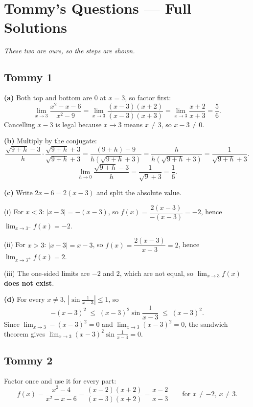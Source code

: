 \documentclass[11pt]{article}
\begin{document}
\section*{Tommy's Questions --- Full Solutions}
\noindent\textit{These two are ours, so the steps are shown.}
\medskip

\subsection*{Tommy 1}

\noindent\textbf{(a)} Both top and bottom are $0$ at $x=3$, so factor first:
\[
\lim_{x\to3}\frac{x^{2}-x-6}{x^{2}-9}
=\lim_{x\to3}\frac{(x-3)(x+2)}{(x-3)(x+3)}
=\lim_{x\to3}\frac{x+2}{x+3}
=\frac{5}{6}.
\]
Cancelling $x-3$ is legal because $x\to3$ means $x\neq3$, so $x-3\neq0$.

\medskip
\noindent\textbf{(b)} Multiply by the conjugate:
\[
\frac{\sqrt{9+h}-3}{h}\cdot\frac{\sqrt{9+h}+3}{\sqrt{9+h}+3}
=\frac{(9+h)-9}{h\left(\sqrt{9+h}+3\right)}
=\frac{h}{h\left(\sqrt{9+h}+3\right)}
=\frac{1}{\sqrt{9+h}+3}.
\]
\[
\lim_{h\to0}\frac{\sqrt{9+h}-3}{h}=\frac{1}{\sqrt{9}+3}=\frac{1}{6}.
\]

\medskip
\noindent\textbf{(c)} Write $2x-6=2(x-3)$ and split the absolute value.

\noindent (i) For $x<3$: $|x-3|=-(x-3)$, so
$f(x)=\dfrac{2(x-3)}{-(x-3)}=-2$, hence $\displaystyle\lim_{x\to3^{-}}f(x)=-2$.

\noindent (ii) For $x>3$: $|x-3|=x-3$, so
$f(x)=\dfrac{2(x-3)}{x-3}=2$, hence $\displaystyle\lim_{x\to3^{+}}f(x)=2$.

\noindent (iii) The one-sided limits are $-2$ and $2$, which are not equal, so
$\displaystyle\lim_{x\to3}f(x)$ \textbf{does not exist}.

\medskip
\noindent\textbf{(d)} For every $x\neq3$, $\left|\sin\!\frac{1}{x-3}\right|\le1$, so
\[
-(x-3)^{2}\;\le\;(x-3)^{2}\sin\!\frac{1}{x-3}\;\le\;(x-3)^{2}.
\]
Since $\displaystyle\lim_{x\to3}-(x-3)^{2}=0$ and $\displaystyle\lim_{x\to3}(x-3)^{2}=0$,
the sandwich theorem gives
$\displaystyle\lim_{x\to3}(x-3)^{2}\sin\!\frac{1}{x-3}=0$.

\bigskip
\subsection*{Tommy 2}

\noindent Factor once and use it for every part:
\[
f(x)=\frac{x^{2}-4}{x^{2}-x-6}=\frac{(x-2)(x+2)}{(x-3)(x+2)}=\frac{x-2}{x-3}
\qquad\text{for }x\neq-2,\ x\neq3 .
\]
\end{document}
